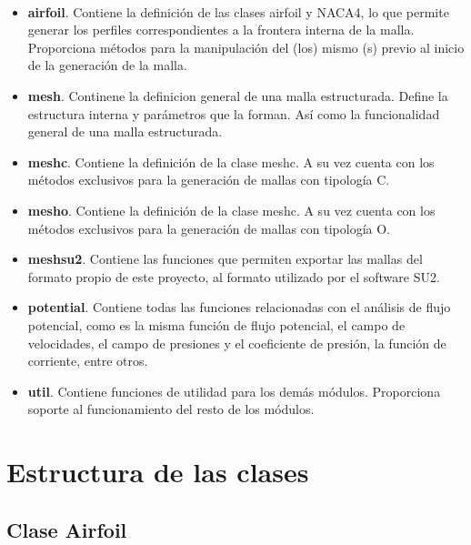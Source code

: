 \documentclass[letterpaper, openright, 12pt]{book}
\begin{document}
    \paragraph*{}
    \begin{itemize}
        \item \textbf{airfoil}. Contiene la definición de las clases airfoil y
            NACA4, lo que permite generar los perfiles correspondientes a la
            frontera interna de la malla. Proporciona métodos para la
            manipulación del (los) mismo (s) previo al inicio de la generación
            de la malla.
        \item \textbf{mesh}. Continene la definicion general de una malla
            estructurada. Define la estructura interna  y parámetros que la
            forman. Así como la funcionalidad general de una malla
            estructurada.
        \item \textbf{mesh\textunderscore c}. Contiene la definición de la
            clase mesh\textunderscore c. A su vez cuenta con los métodos
            exclusivos para la generación de mallas con tipología C.
        \item \textbf{mesh\textunderscore o}. Contiene la definición de la
            clase mesh\textunderscore c. A su vez cuenta con los métodos
            exclusivos para la generación de mallas con tipología O.
        \item \textbf{mesh\textunderscore su2}. Contiene las funciones que
            permiten exportar las mallas del formato propio de este proyecto,
            al formato utilizado por el software SU2.
        \item \textbf{potential}. Contiene todas las funciones relacionadas con
            el análisis de flujo potencial, como es la misma función de flujo
            potencial, el campo de velocidades, el campo de presiones y el
            coeficiente de presión, la función de corriente, entre otros.
        \item \textbf{util}. Contiene funciones de utilidad para los demás
            módulos. Proporciona soporte al funcionamiento del resto de los
            módulos.
    \end{itemize}


    \section{Estructura de las clases}
    \subsection{Clase Airfoil}
\end{document}

